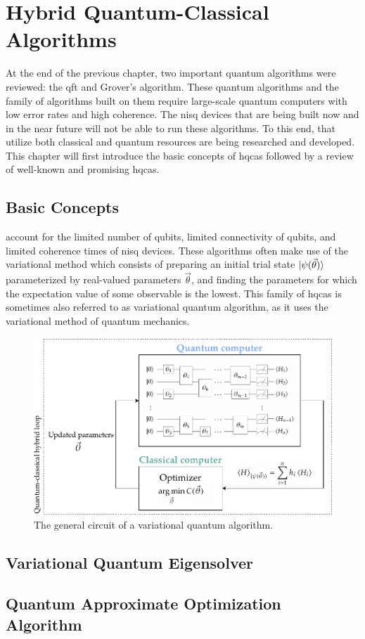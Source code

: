 \chapter[Hybrid Quantum-Classical Algorithms]{Hybrid Quantum-Classical\\Algorithms} \label{chap:hybrid-quantum-classical-algorithms}
At the end of the previous chapter, two important quantum algorithms were reviewed: the \gls{qft} and Grover's algorithm.
These quantum algorithms and the family of algorithms built on them require large-scale quantum computers with low error rates and high coherence.
The \gls{nisq} devices that are being built now and in the near future will not be able to run these algorithms.
To this end,  that utilize both classical and quantum resources are being researched and developed.
This chapter will first introduce the basic concepts of \glspl{hqca} followed by a review of well-known and promising \glspl{hqca}.

\section{Basic Concepts}
 account for the limited number of qubits, limited connectivity of qubits, and limited coherence times of \gls{nisq} devices.
These algorithms often make use of the variational method which consists of preparing an initial trial state $\vert{\psi(\vec{\theta})}\rangle$ parameterized by real-valued parameters $\vec{\theta}$, and finding the parameters for which the expectation value of some observable is the lowest.
This family of \glspl{hqca} is sometimes also referred to as variational quantum algorithm, as it uses the variational method of quantum mechanics.


\begin{figure}[ht]
    \centering
    \includegraphics[width=1\linewidth]{figures/vqa-general-structure.pdf}
    \caption[The general circuit of a variational quantum algorithm.]{The general circuit of a variational quantum algorithm.}
    \label{fig:vqa-general-structure}
\end{figure}


\section{Variational Quantum Eigensolver}

\section{Quantum Approximate Optimization Algorithm}